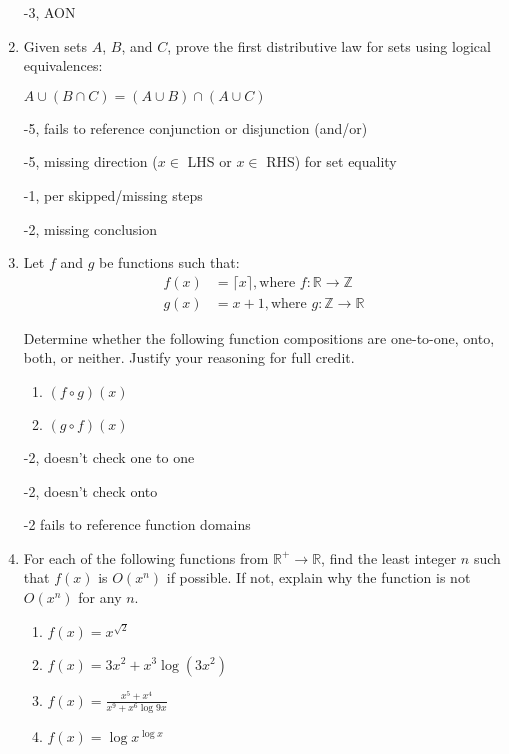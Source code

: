 \begin{enumerate}
\begin{rubric}
-3, AON
\end{rubric}

\item Given sets $A$, $B$, and $C$, prove the first distributive law for sets using logical equivalences:   
\begin{center}
    $A \cup (B \cap C) = (A \cup B) \cap (A \cup C)$
\end{center}

\begin{rubric}
-5, fails to reference conjunction or disjunction (and/or)

-5, missing direction ($x \in $ LHS or $x \in $ RHS) for set equality

-1, per skipped/missing steps

-2, missing conclusion
\end{rubric}

\item Let $f$ and $g$ be functions such that: 
\begin{align*}
    f(x) &= \lceil x \rceil, \text{where } f : \mathbb{R} \rightarrow \mathbb{Z}\\
    g(x) &= x+1, \text{where } g : \mathbb{Z} \rightarrow \mathbb{R}
 \end{align*}

Determine whether the following function compositions are one-to-one, onto, both, or neither. Justify your reasoning for full credit.

\begin{enumerate}
    \item $(f \circ g)(x)$
    \item $(g \circ f)(x)$
\end{enumerate}

\begin{rubric}
    -2, doesn't check one to one
    
    -2, doesn't check onto
    
    -2 fails to reference function domains
\end{rubric}

\item For each of the following functions from $\mathbb{R}^+ \rightarrow \mathbb{R}$, find the least integer $n$ such that $f(x)$ is $O(x^n)$ if possible. If not, explain why the function is not $O(x^n)$ for any $n$. 

\begin{enumerate}
    \item $f(x) = x^{\sqrt{2}}$
    \item $f(x) = 3x^2 + x^3\log(3x^2)$
    \item $f(x) = \frac{x^5 + x^4}{x^9 + x^6\log9x}$
    \item $f(x) = \log x^{\log x}$
\end{enumerate}


\end{enumerate}
